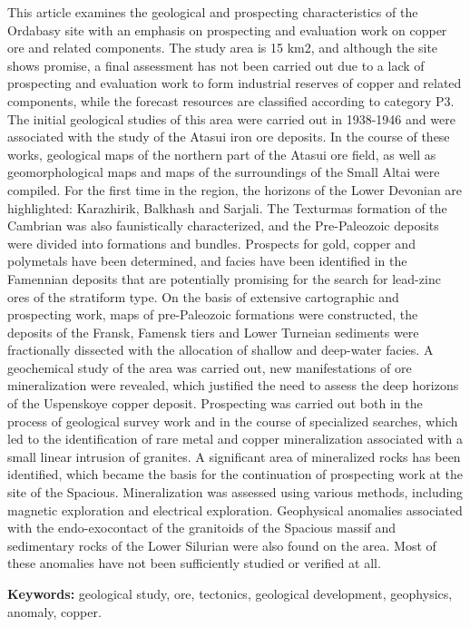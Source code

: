 This article examines the geological and prospecting characteristics of
the Ordabasy site with an emphasis on prospecting and evaluation work on
copper ore and related components. The study area is 15 km2, and
although the site shows promise, a final assessment has not been carried
out due to a lack of prospecting and evaluation work to form industrial
reserves of copper and related components, while the forecast resources
are classified according to category P3. The initial geological studies
of this area were carried out in 1938-1946 and were associated with the
study of the Atasui iron ore deposits. In the course of these works,
geological maps of the northern part of the Atasui ore field, as well as
geomorphological maps and maps of the surroundings of the Small Altai
were compiled. For the first time in the region, the horizons of the
Lower Devonian are highlighted: Karazhirik, Balkhash and Sarjali. The
Texturmas formation of the Cambrian was also faunistically
characterized, and the Pre-Paleozoic deposits were divided into
formations and bundles. Prospects for gold, copper and polymetals have
been determined, and facies have been identified in the Famennian
deposits that are potentially promising for the search for lead-zinc
ores of the stratiform type. On the basis of extensive cartographic and
prospecting work, maps of pre-Paleozoic formations were constructed, the
deposits of the Fransk, Famensk tiers and Lower Turneian sediments were
fractionally dissected with the allocation of shallow and deep-water
facies. A geochemical study of the area was carried out, new
manifestations of ore mineralization were revealed, which justified the
need to assess the deep horizons of the Uspenskoye copper deposit.
Prospecting was carried out both in the process of geological survey
work and in the course of specialized searches, which led to the
identification of rare metal and copper mineralization associated with a
small linear intrusion of granites. A significant area of mineralized
rocks has been identified, which became the basis for the continuation
of prospecting work at the site of the Spacious. Mineralization was
assessed using various methods, including magnetic exploration and
electrical exploration. Geophysical anomalies associated with the
endo-exocontact of the granitoids of the Spacious massif and sedimentary
rocks of the Lower Silurian were also found on the area. Most of these
anomalies have not been sufficiently studied or verified at all.

{\bfseries Keywords:} geological study, ore, tectonics, geological
development, geophysics, anomaly, copper.

